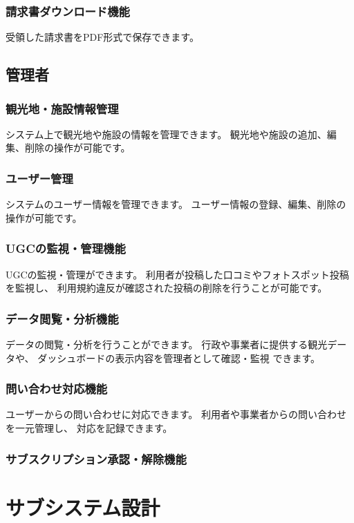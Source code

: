 \documentclass{docs}
\begin{document}
\subsubsection{請求書ダウンロード機能}
受領した請求書をPDF形式で保存できます。

\subsection{管理者}
\subsubsection{観光地・施設情報管理}
システム上で観光地や施設の情報を管理できます。
観光地や施設の追加、編集、削除の操作が可能です。

\subsubsection{ユーザー管理}
システムのユーザー情報を管理できます。
ユーザー情報の登録、編集、削除の操作が可能です。

\subsubsection{UGCの監視・管理機能}
UGCの監視・管理ができます。
利用者が投稿した口コミやフォトスポット投稿を監視し、
利用規約違反が確認された投稿の削除を行うことが可能です。

\subsubsection{データ閲覧・分析機能}
データの閲覧・分析を行うことができます。
行政や事業者に提供する観光データや、
ダッシュボードの表示内容を管理者として確認・監視
できます。

\subsubsection{問い合わせ対応機能}
ユーザーからの問い合わせに対応できます。
利用者や事業者からの問い合わせを一元管理し、
対応を記録できます。

\subsubsection{サブスクリプション承認・解除機能}


\section{サブシステム設計}%
\end{document}
